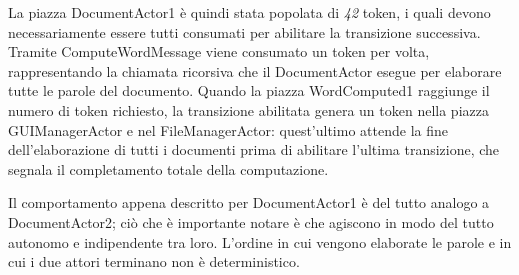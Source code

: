 \noindent La piazza DocumentActor1 è quindi stata popolata di \textit{42} token, i quali devono necessariamente essere tutti consumati per abilitare la transizione successiva. Tramite ComputeWordMessage viene consumato un token per volta, rappresentando la chiamata ricorsiva che il DocumentActor esegue per elaborare tutte le parole del documento.\newline
Quando la piazza WordComputed1 raggiunge il numero di token richiesto, la transizione abilitata genera un token nella piazza GUIManagerActor e nel FileManagerActor: quest'ultimo attende la fine dell'elaborazione di tutti i documenti prima di abilitare l'ultima transizione, che segnala il completamento totale della computazione.\newline

\noindent Il comportamento appena descritto per DocumentActor1 è del tutto analogo a DocumentActor2; ciò che è importante notare è che agiscono in modo del tutto autonomo e indipendente tra loro. L'ordine in cui vengono elaborate le parole e in cui i due attori terminano non è deterministico.
